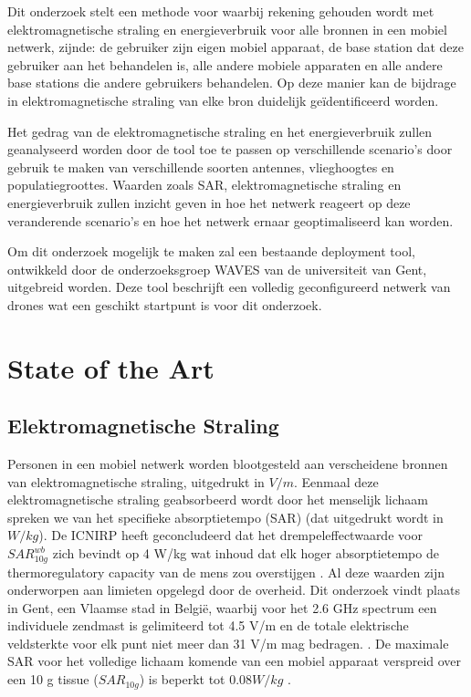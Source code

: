 \documentclass[twocolumn]{phdsymp_dutch}
\begin{document}
Dit onderzoek stelt een methode voor waarbij rekening gehouden wordt met 
elektromagnetische straling en energieverbruik voor alle bronnen in een mobiel netwerk, zijnde: de gebruiker zijn eigen 
mobiel apparaat, de base station dat deze gebruiker aan het behandelen is, alle andere mobiele apparaten en 
alle andere base stations die andere gebruikers behandelen. Op deze manier kan de bijdrage in elektromagnetische straling
 van elke bron duidelijk geïdentificeerd worden. 

Het gedrag van de elektromagnetische straling en het energieverbruik zullen geanalyseerd worden door de 
tool toe te passen op verschillende scenario's door gebruik te maken van verschillende soorten antennes, vlieghoogtes 
en populatiegroottes.
Waarden zoals \gls{SAR}, elektromagnetische straling en energieverbruik zullen inzicht 
geven in hoe het netwerk reageert op deze veranderende scenario's en hoe het netwerk 
ernaar geoptimaliseerd kan worden.

Om dit onderzoek mogelijk te maken zal een bestaande deployment tool, ontwikkeld
door de onderzoeksgroep WAVES van de universiteit van Gent, uitgebreid worden. Deze tool 
beschrijft een volledig geconfigureerd netwerk van drones wat een geschikt startpunt is voor dit onderzoek.

\section{State of the Art}
\subsection{Elektromagnetische Straling}

Personen in een mobiel netwerk worden blootgesteld aan verscheidene bronnen van elektromagnetische straling, uitgedrukt in $V/m$.
Eenmaal deze elektromagnetische straling geabsorbeerd wordt door het menselijk lichaam spreken we van het specifieke absorptietempo (\gls{SAR}) (dat uitgedrukt wordt in $W/kg$).
De \gls{ICNIRP} heeft geconcludeerd dat het drempeleffectwaarde voor $SAR^{wb}_{10g}$ zich bevindt op 
 4 W/kg wat inhoud dat elk hoger absorptietempo de \gls{thermoregulatory capacity} van de mens 
 zou overstijgen  \cite{J23,J24}.
Al deze waarden zijn onderworpen aan limieten opgelegd door de overheid.
Dit onderzoek vindt plaats in Gent, een Vlaamse stad in Belgi\"e, waarbij voor het 2.6 GHz spectrum een individuele zendmast 
is gelimiteerd tot 4.5 V/m en de totale elektrische veldsterkte voor elk punt niet meer dan 31 V/m mag bedragen.  \cite{J23,S13_normenBelgie}. 
De maximale \gls{SAR} voor het volledige lichaam komende van een mobiel apparaat verspreid over een 
10 g tissue ($SAR_{10g}$) is beperkt tot $0.08 W/kg$ \cite{J30,J23,S20}. 
\end{document}
